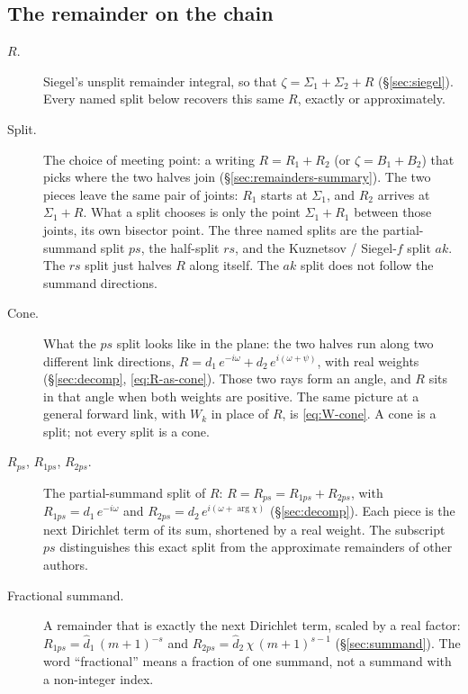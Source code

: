 \documentclass[11pt]{article}
\theoremstyle{definition}
\begin{document}
\subsection*{The remainder on the chain}

\begin{description}
\item[$R$.]
Siegel's unsplit remainder integral, so that
$\zeta=\Sigma_1+\Sigma_2+R$ (\S\ref{sec:siegel}).
Every named split below recovers this same $R$, exactly or
approximately.

\item[Split.]
The choice of meeting point: a writing
$R=R_1+R_2$ (or $\zeta=B_1+B_2$) that picks where the two
halves join
(\S\ref{sec:remainders-summary}).
The two pieces leave the same pair of joints: $R_1$ starts at
$\Sigma_1$, and $R_2$ arrives at $\Sigma_1+R$. What a split
chooses is only the point $\Sigma_1+R_1$ between those joints,
its own bisector point. The three named splits are the
partial-summand split $ps$, the half-split $rs$, and the
Kuznetsov / Siegel-$f$ split $ak$. The $rs$ split just halves
$R$ along itself. The $ak$ split does not follow the summand
directions.

\item[Cone.]
What the $ps$ split looks like in the plane: the two halves run
along two different link directions,
$R=d_1\,e^{-i\omega}+d_2\,e^{i(\omega+\psi)}$, with real weights
(\S\ref{sec:decomp}, \eqref{eq:R-as-cone}).
Those two rays form an angle, and $R$ sits in that angle when
both weights are positive. The same picture at a general forward
link, with $W_k$ in place of $R$, is \eqref{eq:W-cone}.
A cone is a split; not every split is a cone.

\item[$R_{ps}$, $R_{1ps}$, $R_{2ps}$.]
The partial-summand split of $R$:
$R=R_{ps}=R_{1ps}+R_{2ps}$, with
$R_{1ps}=d_1\,e^{-i\omega}$ and
$R_{2ps}=d_2\,e^{i(\omega+\arg\chi)}$
(\S\ref{sec:decomp}).
Each piece is the next Dirichlet term of its sum, shortened by a
real weight.
The subscript $ps$ distinguishes this exact split from the
approximate remainders of other authors.

\item[Fractional summand.]
A remainder that is exactly the next Dirichlet term, scaled by a
real factor: $R_{1ps}=\hat d_1\,(m+1)^{-s}$ and
$R_{2ps}=\hat d_2\,\chi\,(m+1)^{s-1}$
(\S\ref{sec:summand}).
The word ``fractional'' means a fraction of one summand, not a
summand with a non-integer index.


\end{description}
\end{document}
